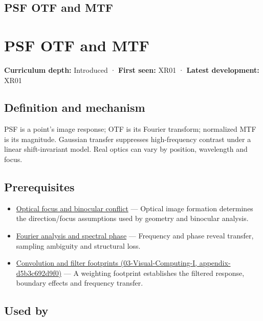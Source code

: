 \hypertarget{appendix-8b76b0efd27f}{}
\section*{PSF OTF and MTF}
\chapter{PSF OTF and MTF}\label{appendix-8b76b0efd27f-psf-otf-and-mtf}

\textbf{Curriculum depth:} Introduced · \textbf{First seen:} XR01 · \textbf{Latest development:} XR01

\section{Definition and mechanism}\label{appendix-8b76b0efd27f-definition-and-mechanism}

PSF is a point's image response; OTF is its Fourier transform; normalized MTF is its magnitude. Gaussian transfer suppresses high-frequency contrast under a linear shift-invariant model. Real optics can vary by position, wavelength and focus.

\section{Prerequisites}\label{appendix-8b76b0efd27f-prerequisites}

\begin{itemize}
\tightlist
\item
  \hyperref[appendix-f90cee1be7a4]{Optical focus and binocular conflict} --- Optical image formation determines the direction/focus assumptions used by geometry and binocular analysis.
\item
  \hyperref[appendix-b60686ba06a1]{Fourier analysis and spectral phase} --- Frequency and phase reveal transfer, sampling ambiguity and structural loss.
\item
  \href{../03-Visual-Computing-I/main.pdf\#nameddest=appendix-d5b3c692d9f0}{Convolution and filter footprints (03-Visual-Computing-I, appendix-d5b3c692d9f0)} --- A weighting footprint establishes the filtered response, boundary effects and frequency transfer.
\end{itemize}

\section{Used by}\label{appendix-8b76b0efd27f-used-by}

